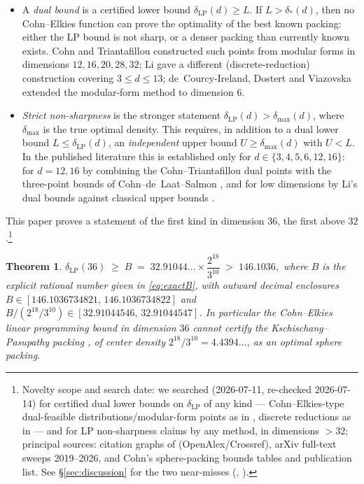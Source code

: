 \documentclass[11pt]{article}
\newtheorem{theorem}{Theorem}[section]
\theoremstyle{remark}
\newcommand{\LP}{\mathrm{LP}}
\begin{document}
\begin{itemize}
\item A \emph{dual bound} is a certified lower bound
  $\delta_{\LP}(d)\ge L$. If $L>\delta_*(d)$, then no Cohn--Elkies
  function can prove the optimality of the best known packing: either
  the LP bound is not sharp, or a denser packing than currently known
  exists. Cohn and Triantafillou \cite{CT} constructed such points from
  modular forms in dimensions $12,16,20,28,32$; Li \cite{Li} gave a
  different (discrete-reduction) construction covering $3\le d\le 13$;
  de~Courcy-Ireland, Dostert and Viazovska \cite{dCIDV} extended the
  modular-form method to dimension $6$.
\item \emph{Strict non-sharpness} is the stronger statement
  $\delta_{\LP}(d)>\delta_{\max}(d)$, where $\delta_{\max}$ is the true
  optimal density. This requires, in addition to a dual lower bound
  $L\le\delta_{\LP}(d)$, an \emph{independent} upper bound
  $U\ge\delta_{\max}(d)$ with $U<L$. In the published literature this is established only for
  $d\in\{3,4,5,6,12,16\}$: for $d=12,16$ by combining the
  Cohn--Triantafillou dual points with the three-point bounds of
  Cohn--de~Laat--Salmon \cite{CdLS}, and for low dimensions by Li's dual
  bounds against classical upper bounds \cite{Li,dCIDV}.
\end{itemize}

This paper proves a statement of the first kind in dimension $36$, the
first above $32$.\footnote{Novelty scope and search date: we searched
(2026-07-11, re-checked 2026-07-14) for certified dual lower bounds on
$\delta_{\LP}$ of any kind --- Cohn--Elkies-type dual-feasible
distributions/modular-form points as in \cite{CT,dCIDV}, discrete
reductions as in \cite{Li} --- and for LP non-sharpness claims by any
method, in dimensions $>32$; principal sources: citation graphs of
\cite{CT} (OpenAlex/Crossref), arXiv full-text sweeps 2019--2026, and
Cohn's sphere-packing bounds tables and publication list. See
\S\ref{sec:discussion} for the two
near-misses (\cite{Zhou}, \cite{AJCHdLT}).}

\begin{theorem}\label{thm:main}
$\delta_{\LP}(36)\;\ge\;B\;=\;32.91044\ldots\times
\dfrac{2^{18}}{3^{10}}\;>\;146.1036,$
where $B$ is the explicit rational number given in \eqref{eq:exactB},
with outward decimal enclosures
$B\in[146.1036734821,\,146.1036734822]$ and
$B/(2^{18}/3^{10})\in[32.91044546,\,32.91044547]$.
In particular the Cohn--Elkies linear programming bound in dimension
$36$ cannot certify the Kschischang--Pasupathy packing
\cite{KP}, of center density $2^{18}/3^{10}=4.4394\ldots$, as an optimal
sphere packing.
\end{theorem}
\end{document}
